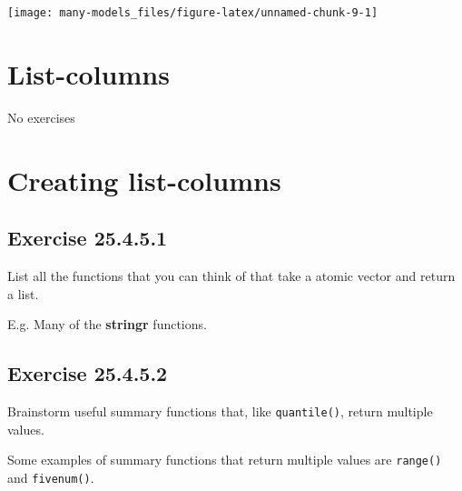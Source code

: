 \documentclass[]{book}
\newenvironment{Shaded}{\begin{snugshade}}{\end{snugshade}}
\newcommand{\CommentTok}[1]{\textcolor[rgb]{0.56,0.35,0.01}{\textit{#1}}}
\newcommand{\KeywordTok}[1]{\textcolor[rgb]{0.13,0.29,0.53}{\textbf{#1}}}
\newcommand{\NormalTok}[1]{#1}
\newcommand{\OperatorTok}[1]{\textcolor[rgb]{0.81,0.36,0.00}{\textbf{#1}}}
\theoremstyle{plain}
\theoremstyle{remark}
\begin{document}
\begin{center}\texttt{[image: many-models\_files/figure-latex/unnamed-chunk-9-1]} \end{center}

\hypertarget{list-columns}{%
\section{List-columns}\label{list-columns}}

No exercises

\hypertarget{creating-list-columns}{%
\section{Creating list-columns}\label{creating-list-columns}}

\hypertarget{exercise-25.4.5.1}{%
\subsection*{\texorpdfstring{Exercise
{25.4.5.1}}{Exercise 25.4.5.1}}\label{exercise-25.4.5.1}}

List all the functions that you can think of that take a atomic vector
and return a list.

E.g. Many of the \textbf{stringr} functions.

\hypertarget{exercise-25.4.5.2}{%
\subsection*{\texorpdfstring{Exercise
{25.4.5.2}}{Exercise 25.4.5.2}}\label{exercise-25.4.5.2}}

Brainstorm useful summary functions that, like \texttt{quantile()},
return multiple values.

Some examples of summary functions that return multiple values are
\texttt{range()} and \texttt{fivenum()}.

\begin{Shaded}
\end{Shaded}
\end{document}
